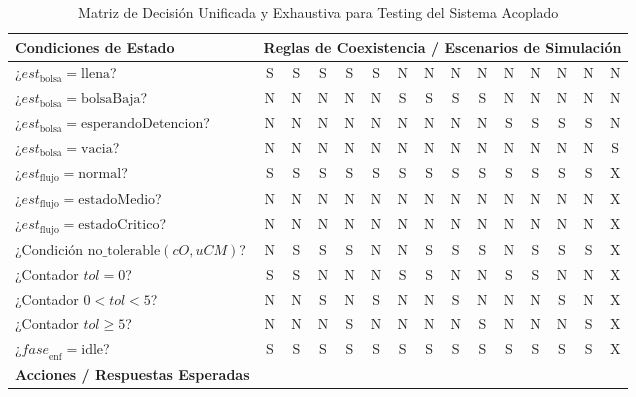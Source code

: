 \begin{table}[htbp]
\centering
\caption{Matriz de Decisión Unificada y Exhaustiva para Testing del Sistema Acoplado}
\label{tab:matriz_decision_maestra}
\footnotesize %
\setlength{\tabcolsep}{3.5pt} %
\begin{tabular}{|l|*{14}{c|}}
\hline
\textbf{Condiciones de Estado} & \multicolumn{14}{c|}{\textbf{Reglas de Coexistencia / Escenarios de Simulación}} \\ \hline
¿$est_{\mathrm{bolsa}} = \mathrm{llena}$?         & S & S & S & S & S & N & N & N & N & N & N & N & N & N \\ \hline
¿$est_{\mathrm{bolsa}} = \mathrm{bolsaBaja}$?     & N & N & N & N & N & S & S & S & S & N & N & N & N & N \\ \hline
¿$est_{\mathrm{bolsa}} = \mathrm{esperandoDetencion}$? & N & N & N & N & N & N & N & N & N & S & S & S & S & N \\ \hline
¿$est_{\mathrm{bolsa}} = \mathrm{vacia}$?         & N & N & N & N & N & N & N & N & N & N & N & N & N & S \\ \hline
¿$est_{\mathrm{flujo}} = \mathrm{normal}$?        & S & S & S & S & S & S & S & S & S & S & S & S & S & X \\ \hline
¿$est_{\mathrm{flujo}} = \mathrm{estadoMedio}$?   & N & N & N & N & N & N & N & N & N & N & N & N & N & X \\ \hline
¿$est_{\mathrm{flujo}} = \mathrm{estadoCritico}$? & N & N & N & N & N & N & N & N & N & N & N & N & N & X \\ \hline
¿Condición $\mathrm{no\_tolerable}(cO, uCM)$?   & N & S & S & S & N & N & S & S & S & N & S & S & S & X \\ \hline
¿Contador $tol = 0$?                              & S & S & N & N & N & S & S & N & N & S & S & N & N & X \\ \hline
¿Contador $0 < tol < 5$?                          & N & N & S & N & S & N & N & S & N & N & N & S & N & X \\ \hline
¿Contador $tol \ge 5$?                            & N & N & N & S & N & N & N & N & S & N & N & N & S & X \\ \hline
¿$\mathit{fase}_{\mathrm{enf}} = \mathrm{idle}$?     & S & S & S & S & S & S & S & S & S & S & S & S & S & X \\ \hline
\hline
\textbf{Acciones / Respuestas Esperadas} & \multicolumn{14}{c|}{} \\ \hline

\end{tabular}
\end{table}
